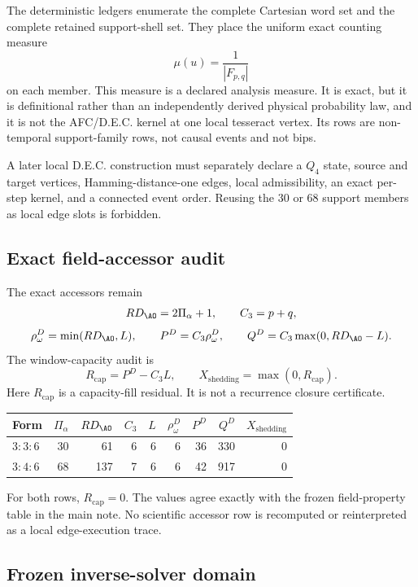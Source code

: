 The deterministic ledgers enumerate the complete Cartesian word set and the
complete retained support-shell set.  They place the uniform exact counting
measure
\[
\mu(u)=\frac{1}{|F_{p,q}|}
\]
on each member.  This measure is a declared analysis measure.  It is exact,
but it is definitional rather than an independently derived physical
probability law, and it is not the AFC/D.E.C. kernel at one local tesseract
vertex.  Its rows are non-temporal support-family rows, not causal events and
not bips.

A later local D.E.C. construction must separately declare a \(Q_4\) state,
source and target vertices, Hamming-distance-one edges, local admissibility,
an exact per-step kernel, and a connected event order.  Reusing the \(30\) or
\(68\) support members as local edge slots is forbidden.

\subsection{Exact field-accessor audit}

The exact accessors remain
\[
RD_{\AO}=2\Pi_\alpha+1,
\qquad
C_3=p+q,
\]
\[
\rho^D_\omega=\min(RD_{\AO},L),
\qquad
P^D=C_3\rho^D_\omega,
\qquad
Q^D=C_3\max(0,RD_{\AO}-L).
\]
The window-capacity audit is
\[
R_{\mathrm{cap}}=P^D-C_3L,
\qquad
X_{\mathrm{shedding}}=\max(0,R_{\mathrm{cap}}).
\]
Here \(R_{\mathrm{cap}}\) is a capacity-fill residual.  It is not a recurrence
closure certificate.

\begin{center}
\small
\begin{tabular}{@{}lrrrrrrrr@{}}
\toprule
Form & \(\Pi_\alpha\) & \(RD_{\AO}\) & \(C_3\) & \(L\) & \(\rho^D_\omega\) & \(P^D\) & \(Q^D\) & \(X_{\mathrm{shedding}}\) \\
\midrule
\(3{:}3{:}6\) & 30 & 61 & 6 & 6 & 6 & 36 & 330 & 0 \\
\(3{:}4{:}6\) & 68 & 137 & 7 & 6 & 6 & 42 & 917 & 0 \\
\bottomrule
\end{tabular}
\end{center}

For both rows, \(R_{\mathrm{cap}}=0\).  The values agree exactly with the
frozen field-property table in the main note.  No scientific accessor row is
recomputed or reinterpreted as a local edge-execution trace.

\subsection{Frozen inverse-solver domain}

